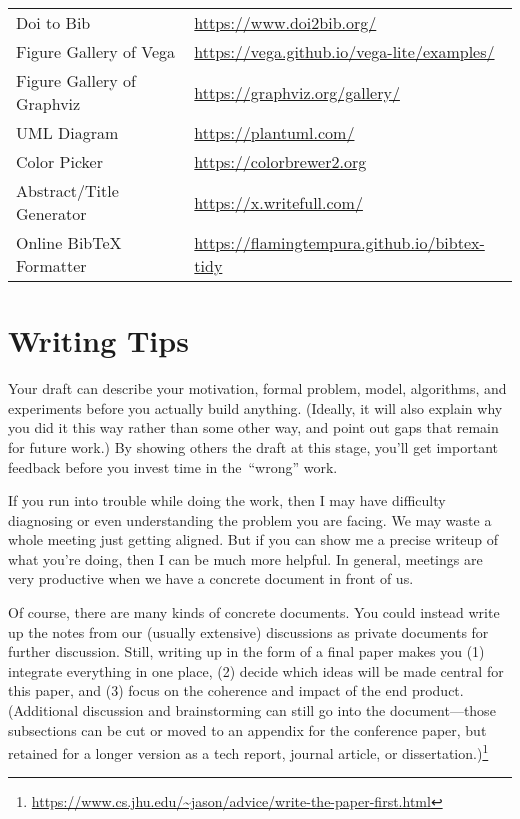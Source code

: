 \begin{table}
\begin{tabular}{ll}
		Doi to Bib                        & \url{https://www.doi2bib.org/}                     \\
		Figure Gallery of Vega            & \url{https://vega.github.io/vega-lite/examples/}   \\
		Figure Gallery of Graphviz        & \url{https://graphviz.org/gallery/}                \\
		UML Diagram                       & \url{https://plantuml.com/}                        \\
		Color Picker                      & \url{https://colorbrewer2.org}                     \\
		Abstract/Title Generator          & \url{https://x.writefull.com/}                     \\
		Online BibTeX Formatter           & \url{https://flamingtempura.github.io/bibtex-tidy} \\
		\bottomrule
	\end{tabular}
\end{table}

\section{Writing Tips}

Your draft can describe your motivation, formal problem, model, algorithms, and experiments before you actually build anything.
(Ideally, it will also explain why you did it this way rather than some other way, and point out gaps that remain for future work.)
By showing others the draft at this stage, you'll get important feedback before you invest time in the~\enquote{wrong} work.

If you run into trouble while doing the work, then I may have difficulty diagnosing or even understanding the problem you are facing.
We may waste a whole meeting just getting aligned.
But if you can show me a precise writeup of what you're doing, then I can be much more helpful.
In general, meetings are very productive when we have a concrete document in front of us.


Of course, there are many kinds of concrete documents.
You could instead write up the notes from our (usually extensive) discussions as private documents for further discussion.
Still, writing up in the form of a final paper makes you (1) integrate everything in one place, (2) decide which ideas will be made central for this paper, and (3) focus on the coherence and impact of the end product.
(Additional discussion and brainstorming can still go into the document—those subsections can be cut or moved to an appendix for the conference paper, but retained for a longer version as a tech report, journal article, or dissertation.)\footnote{\url{https://www.cs.jhu.edu/~jason/advice/write-the-paper-first.html}}

